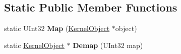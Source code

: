 \subsection*{Static Public Member Functions}
\begin{DoxyCompactItemize}
\item 
\mbox{\label{class_i_p_c___manager___internal_1_1_entry_ac0139be73bef62997dff89d613914088}} 
static U\+Int32 {\bfseries Map} (\hyperlink{class_kernel_object}{Kernel\+Object} $\ast$object)
\item 
\mbox{\label{class_i_p_c___manager___internal_1_1_entry_ab93847831a98c8904b96e18bf27ed16d}} 
static \hyperlink{class_kernel_object}{Kernel\+Object} $\ast$ {\bfseries Demap} (U\+Int32 map)
\end{DoxyCompactItemize}
